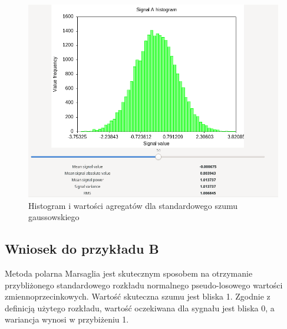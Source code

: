 \documentclass{article}
\begin{document}
\begin{figure}[h!]
 \centering
 \includegraphics[width=14cm]{gauss_histosum.png}
 \vspace{-0.3cm}
 \caption{Histogram i wartości agregatów dla standardowego szumu gaussowskiego}
 \label{fig:gauss_histosum}
\end{figure}
\newpage
\subsection{Wniosek do przykładu B}
Metoda polarna Marsaglia jest skutecznym sposobem na otrzymanie przybliżonego standardowego rozkładu normalnego pseudo-losowego wartości zmiennoprzecinkowych. Wartość skuteczna szumu jest bliska 1. Zgodnie z definicją użytego rozkładu, wartość oczekiwana dla sygnału jest bliska 0, a wariancja wynosi  w przybiżeniu 1.
\end{document}
